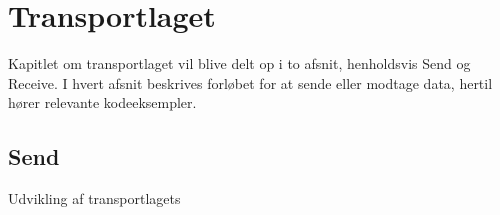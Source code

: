 \chapter{Transportlaget}
Kapitlet om transportlaget vil blive delt op i to afsnit, henholdsvis Send og Receive. I hvert afsnit beskrives forløbet for at sende eller modtage data, hertil hører relevante kodeeksempler.

\section{Send}
Udvikling af transportlagets 